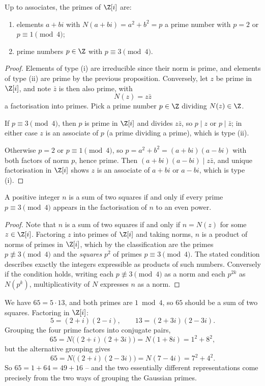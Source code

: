 \begin{theorem}[{Primes in $\Z[i]$}]
	Up to associates, the primes of $\Z[i]$ are:
	\begin{enumerate}[label=(\roman*)]
		\item elements $a + bi$ with $N(a + bi) = a^2 + b^2 = p$ a prime number with $p = 2$ or $p \equiv 1 \pmod 4$;
		\item prime numbers $p \in \Z$ with $p \equiv 3 \pmod 4$.
	\end{enumerate}
\end{theorem}
\begin{proof}
	Elements of type (i) are irreducible since their norm is prime, and elements of type (ii) are prime by the previous proposition. Conversely, let $z$ be prime in $\Z[i]$, and note $\bar{z}$ is then also prime, with
	$$
	N(z) = z \bar z
	$$
	a factorisation into primes. Pick a prime number $p \in \Z$ dividing $N(z) \in \Z$.

	If $p \equiv 3 \pmod 4$, then $p$ is prime in $\Z[i]$ and divides $z \bar z$, so $p \mid z$ or $p \mid \bar z$; in either case $z$ is an associate of $p$ (a prime dividing a prime), which is type (ii).

	Otherwise $p = 2$ or $p \equiv 1 \pmod 4$, so $p = a^2 + b^2 = (a + bi)(a - bi)$ with both factors of norm $p$, hence prime. Then $(a + bi)(a - bi) \mid z \bar z$, and unique factorisation in $\Z[i]$ shows $z$ is an associate of $a + bi$ or $a - bi$, which is type (i).
\end{proof}

\begin{corollary}
	A positive integer $n$ is a sum of two squares if and only if every prime $p \equiv 3 \pmod 4$ appears in the factorisation of $n$ to an even power.
\end{corollary}
\begin{proof}
	Note that $n$ is a sum of two squares if and only if $n = N(z)$ for some $z \in \Z[i]$. Factoring $z$ into primes of $\Z[i]$ and taking norms, $n$ is a product of norms of primes in $\Z[i]$, which by the classification are the primes $p \not\equiv 3 \pmod 4$ and the \emph{squares} $p^2$ of primes $p \equiv 3 \pmod 4$. The stated condition describes exactly the integers expressible as products of such numbers. Conversely if the condition holds, writing each $p \not\equiv 3 \pmod 4$ as a norm and each $p^{2k}$ as $N(p^k)$, multiplicativity of $N$ expresses $n$ as a norm.
\end{proof}

\begin{example}
	We have $65 = 5 \cdot 13$, and both primes are $1 \bmod 4$, so $65$ should be a sum of two squares. Factoring in $\Z[i]$:
	$$
	5 = (2 + i)(2 - i), \qquad 13 = (2 + 3i)(2 - 3i).
	$$
	Grouping the four prime factors into conjugate pairs,
	$$
	65 = N\big((2 + i)(2 + 3i)\big) = N(1 + 8i) = 1^2 + 8^2,
	$$
	but the alternative grouping gives
	$$
	65 = N\big((2 + i)(2 - 3i)\big) = N(7 - 4i) = 7^2 + 4^2.
	$$
	So $65 = 1 + 64 = 49 + 16$ -- and the two essentially different representations come precisely from the two ways of grouping the Gaussian primes.
\end{example}

